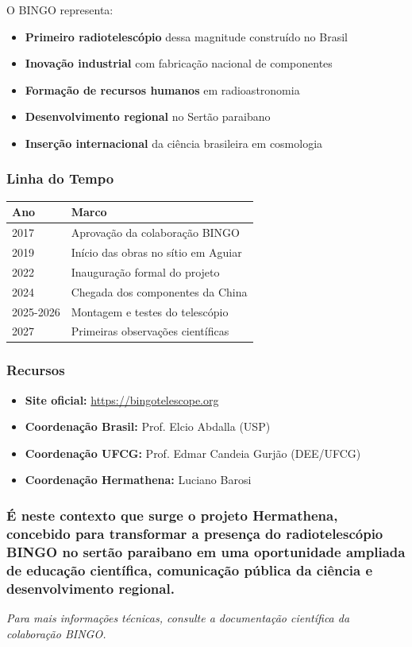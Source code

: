 O BINGO representa:

\begin{itemize}
\item \textbf{Primeiro radiotelescópio} dessa magnitude construído no Brasil
\item \textbf{Inovação industrial} com fabricação nacional de componentes
\item \textbf{Formação de recursos humanos} em radioastronomia
\item \textbf{Desenvolvimento regional} no Sertão paraibano
\item \textbf{Inserção internacional} da ciência brasileira em cosmologia
\end{itemize}

\subsubsection{Linha do Tempo}

\bigskip\noindent
\begin{tabular}{p{}p{}}
\toprule
Ano & Marco \\
\hline
2017 & Aprovação da colaboração BINGO \\
2019 & Início das obras no sítio em Aguiar \\
2022 & Inauguração formal do projeto \\
2024 & Chegada dos componentes da China \\
2025-2026 & Montagem e testes do telescópio \\
2027 & Primeiras observações científicas \\
\bottomrule
\end{tabular}

\bigskip

\subsubsection{Recursos}

\begin{itemize}
\item \textbf{Site oficial:} \href{https://bingotelescope.org}{https://bingotelescope.org}
\item \textbf{Coordenação Brasil:} Prof. Elcio Abdalla (USP)
\item \textbf{Coordenação UFCG:} Prof. Edmar Candeia Gurjão (DEE/UFCG)
\item \textbf{Coordenação Hermathena:} Luciano Barosi
\end{itemize}

\subsubsection{É neste contexto que surge o projeto Hermathena, concebido para transformar a presença do radiotelescópio BINGO no sertão paraibano em uma oportunidade ampliada de educação científica, comunicação pública da ciência e desenvolvimento regional.}

\textit{Para mais informações técnicas, consulte a documentação científica da colaboração BINGO.}